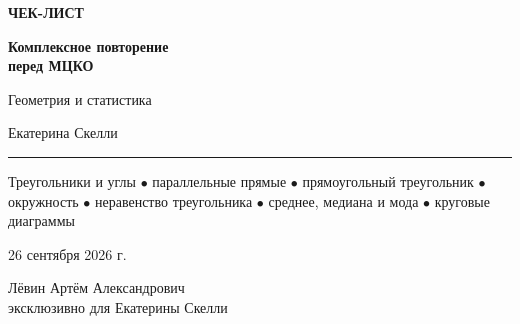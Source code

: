 \documentclass[a4paper,12pt]{article}
\renewcommand{\today}{26 сентября 2026 г.}
\begin{document}
\begin{titlepage}
\thispagestyle{empty}

\begin{center}
\vspace*{16mm}

{\color{darkaccent}\Large\bfseries ЧЕК-ЛИСТ}

\vspace{7mm}

{\Huge\bfseries
Комплексное повторение\\[2mm]
перед МЦКО}

\vspace{6mm}

{\Large Геометрия и статистика}

\vspace{18mm}

{\large Екатерина Скелли}

\vspace{12mm}

{\color{accent}\rule{0.54\linewidth}{0.9pt}}

\vspace{12mm}

\begin{minipage}{0.80\linewidth}
\centering
\large
Треугольники и углы $\bullet$
параллельные прямые $\bullet$
прямоугольный треугольник $\bullet$
окружность $\bullet$
неравенство треугольника $\bullet$
среднее, медиана и мода $\bullet$
круговые диаграммы
\end{minipage}

\vfill

{\large \today}

\vspace{10mm}

{\small
Лёвин Артём Александрович\\
эксклюзивно для Екатерины Скелли
}

\vspace{16mm}


\end{center}
\end{titlepage}
\end{document}
